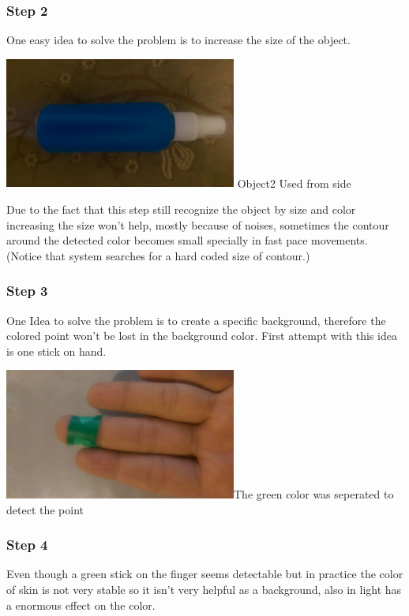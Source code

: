 \documentclass{report}
\begin{document}
\subsubsection{Step 2}
One easy idea to solve the problem is to increase the size of the object.
\begin{center}
	\includegraphics[width=3in]{Object2.jpg} \newline \figurename{Object2} Used from side 
\end{center}
Due to the fact that this step still recognize the object by size and color increasing the size won't help, mostly because of noises, sometimes the contour around the detected color becomes small specially in fast pace movements.  (Notice that system searches for a hard coded size of contour.)
\subsubsection{Step 3}
One Idea to solve the problem is to create a specific background, therefore the colored point won't be lost in the background color. First attempt with this idea is one stick on hand. \newline
\begin{center}
	\includegraphics[width=3in]{Object3.jpg}\newline \figurename{The green color was seperated to detect the point}
\end{center}
\subsubsection{Step 4}
Even though a green stick on the finger seems detectable but in practice the color of skin is not very stable so it isn't very helpful as a background, also in light has a enormous effect on the color.
\end{document}
